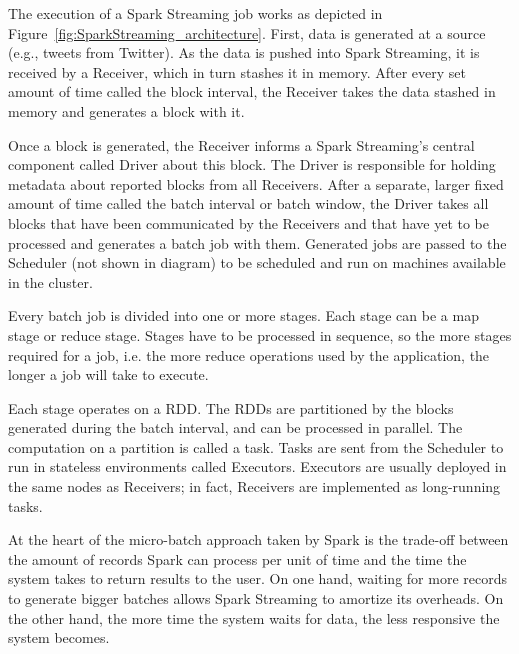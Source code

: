 The execution of a Spark Streaming job works as depicted in Figure~\ref{fig:SparkStreaming_architecture}. 
First, data is generated at a source (e.g., tweets from Twitter). As the data is pushed into Spark Streaming, it is received by a Receiver, which in turn stashes it in memory. After every set amount of time called the block interval, the Receiver takes the data stashed in memory and generates a block with it.

Once a block is generated, the Receiver informs a Spark Streaming's central component called Driver about this block. The Driver is responsible for holding metadata about reported blocks from all Receivers.
After a separate, larger fixed amount of time called the batch interval or batch window, the Driver takes all blocks that have been communicated by the Receivers and that have yet to be processed and generates a batch job with them. Generated jobs are passed to the Scheduler (not shown in diagram) to be scheduled and run on machines available in the cluster.

Every batch job is divided into one or more stages. Each stage can be a map stage or reduce stage. Stages have to be processed in sequence, so the more stages required for a job, i.e. the more reduce operations used by the application, the longer a job will take to execute.

Each stage operates on a RDD. The RDDs are partitioned by the blocks generated during the batch interval, and can be processed in parallel. The computation on a partition is called a task. Tasks are sent from the Scheduler to run in stateless environments called Executors. Executors are usually deployed in the same nodes as Receivers; in fact, Receivers are implemented as long-running tasks.


At the heart of the micro-batch approach taken by Spark is the trade-off between the amount of records Spark can process per unit of time and the time the system takes to return results to the user.
On one hand, waiting for more records to generate bigger batches allows Spark Streaming to amortize its overheads. On the other hand, the more time the system waits for data, the less responsive the system becomes.


